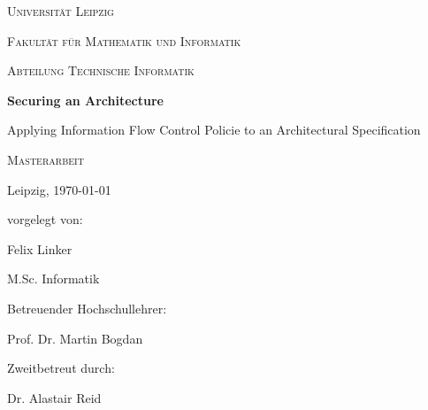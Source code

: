 \documentclass{securem}
\begin{document}
\begin{titlepage}
    \centering
    \par
    \vspace{1cm}
    {\scshape\LARGE Universität Leipzig} \par
    \vspace{0.3cm}
    {\scshape\Large Fakultät für Mathematik und Informatik} \par
    {\scshape\Large Abteilung Technische Informatik} \par
    \vspace{2.3cm}
    {\huge\bfseries Securing an Architecture} \par
    {\Large Applying Information Flow Control Policie to an Architectural Specification} \par
    \vspace{1.5cm}
    {\scshape\Large Masterarbeit} \par
    \vspace{0.3cm}
    {\large Leipzig, \today} \par
    \vspace {1.5cm}
    {
        vorgelegt von: \par
        Felix Linker \par
        M.Sc. Informatik
    }
    \vfill
    \begin{multicols}{2}
        Betreuender Hochschullehrer: \par
        Prof. Dr. Martin Bogdan \par
        \columnbreak
        Zweitbetreut durch: \par
        Dr. Alastair Reid
    \end{multicols}
\end{titlepage}

\newpage

\tableofcontents
\thispagestyle{empty}

\newpage

\setcounter{page}{1}











\end{document}
